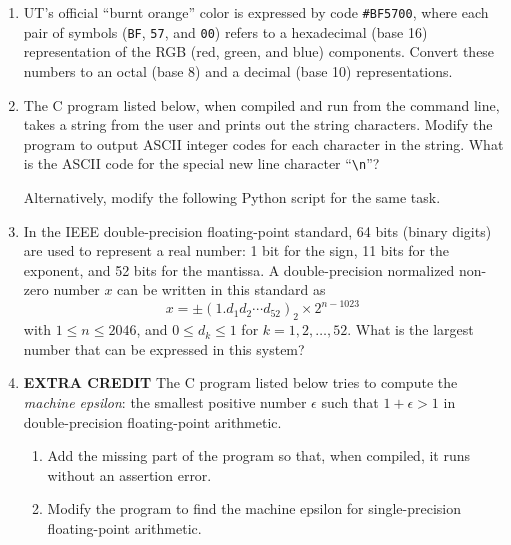 \begin{enumerate}

\item UT's official ``burnt orange'' color is expressed by code
  \texttt{\#BF5700}, where each pair of symbols (\texttt{BF},
  \texttt{57}, and \texttt{00}) refers to a hexadecimal (base 16)
  representation of the RGB (red, green, and blue) components. Convert these
  numbers to an octal (base 8) and a decimal (base 10) representations.

\item The C program listed below, when compiled and
  run from the command line, takes a string from the user and prints
  out the string characters. Modify the program to output ASCII
  integer codes for each character in the string. What is the ASCII
  code for the special new line character ``\verb+\n+''?

\lstset{language=c,numbers=left,numberstyle=\tiny,showstringspaces=false}


Alternatively, modify the following Python script for the same task.

\lstset{language=python,numbers=left,numberstyle=\tiny,showstringspaces=false}


\item In the IEEE double-precision floating-point standard, 64 bits
  (binary digits) are used to represent a real number: 1 bit for the
  sign, 11 bits for the exponent, and 52 bits for the mantissa. A
  double-precision normalized non-zero number $x$ can be written in
  this standard as 
  \[
  x = \pm (1.d_1d_2{\cdots}d_{52})_2 \times 2^{n-1023}\,
  \]
  with $1 \le n \le 2046$, and $0 \le d_k \le 1$ for
  $k=1,2,\ldots,52$. What is the largest number that can be expressed
  in this system?

\item \textbf{EXTRA CREDIT} The C program listed below tries to compute the \emph{machine
    epsilon}: the smallest positive number $\epsilon$ such that
  $1+\epsilon > 1$ in double-precision floating-point arithmetic. 

\begin{enumerate}
\item Add the missing part of the program so that, when compiled, it
  runs without an assertion error.
\item Modify the program to find the machine epsilon for single-precision floating-point arithmetic.
\end{enumerate}



\end{enumerate}


